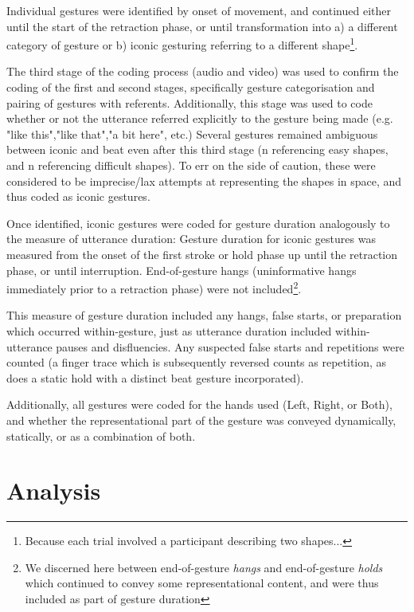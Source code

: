 \documentclass[a4paper,man,natbib]{apa6}
\newcommand*{\term}[1]{\emph{#1}} %
\begin{document}
Individual gestures were identified by onset of movement, and continued either until the start of the retraction phase, or until transformation into a) a different category of gesture or b) iconic gesturing referring to a different shape\footnote{Because each trial involved a participant describing two shapes...}. 

The third stage of the coding process (audio and video) was used to confirm the coding of the first and second stages, specifically gesture categorisation and pairing of gestures with referents.
Additionally, this stage was used to code whether or not the utterance referred explicitly to the gesture being made (e.g. "like this","like that","a bit here", etc.)
Several gestures remained ambiguous between iconic and beat even after this third stage (n referencing easy shapes, and n referencing difficult shapes).%
To err on the side of caution, these were considered to be imprecise/lax attempts at representing the shapes in space, and thus coded as iconic gestures.

Once identified, iconic gestures were coded for gesture duration analogously to the measure of utterance duration:
Gesture duration for iconic gestures was measured from the onset of the first stroke or hold phase up until the retraction phase, or until interruption.
End-of-gesture hangs (uninformative hangs immediately prior to a retraction phase) were not included\footnote{We discerned here between end-of-gesture \term{hangs} and end-of-gesture \term{holds} which continued to convey some representational content, and were thus included as part of gesture duration}.

This measure of gesture duration included any hangs, false starts, or preparation which occurred within-gesture, just as utterance duration included within-utterance pauses and disfluencies.
Any suspected false starts and repetitions were counted (a finger trace which is subsequently reversed counts as repetition, as does a static hold with a distinct beat gesture incorporated).

Additionally, all gestures were coded for the hands used (Left, Right, or Both), and whether the representational part of the gesture was conveyed dynamically, statically, or as a combination of both. 



\section{Analysis}
\end{document}

